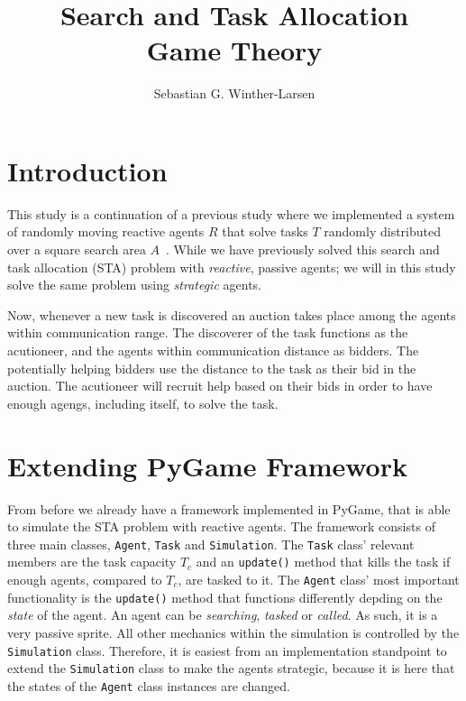 \documentclass[11pt]{article}
\title{Search and Task Allocation \\
    \small{Game Theory}}
\author{Sebastian G. Winther-Larsen}
\begin{document}
    \maketitle

    \section{Introduction}
        This study is a continuation of a previous study where we 
        implemented a system of randomly moving reactive agents
        $R$ that solve tasks $T$ randomly distributed over 
        a square search area $A$~\cite{greg2020mas}. While we have 
        previously solved this search and task allocation (STA) problem
        with \emph{reactive}, passive agents; we will in this study solve the 
        same problem using \emph{strategic} agents.

        Now, whenever a new task is discovered an auction takes place among the 
        agents within communication range. The discoverer of the task functions 
        as the acutioneer, and the agents within communication distance as
        bidders. The potentially helping bidders use the distance to the 
        task as their bid in the auction. The acutioneer will recruit help 
        based on their bids in order to have enough agengs, including itself,
        to solve the task.

    \section{Extending PyGame Framework}

        From before we already have a framework implemented in PyGame\cite{pygame},
        that is able to simulate the STA problem with reactive agents. The 
        framework consists of three main classes, \lstinline|Agent|, \lstinline|Task|
        and \lstinline|Simulation|. The \lstinline|Task| class' relevant members
        are the task capacity $T_c$ and an \lstinline|update()| method that kills the 
        task if enough agents, compared to $T_c$, are tasked to it. The \lstinline|Agent|
        class' most important functionality is the \lstinline|update()| method that 
        functions differently depding on the \emph{state} of the agent. An agent can be 
        \emph{searching}, \emph{tasked} or \emph{called}. As such, it is a very passive 
        sprite. All other mechanics within the simulation is controlled by the 
        \lstinline|Simulation| class. Therefore, it is easiest from an implementation 
        standpoint to extend the \lstinline|Simulation| class to make the 
        agents strategic, because it is here that the states of the \lstinline|Agent| 
        class instances are changed.
\end{document}
